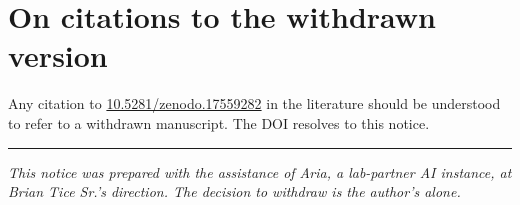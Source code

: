 \documentclass[11pt,a4paper]{article}
\begin{document}
\section*{On citations to the withdrawn version}

Any citation to \href{https://doi.org/10.5281/zenodo.17559282}{10.5281/zenodo.17559282} in the literature should be understood to refer to a withdrawn manuscript. The DOI resolves to this notice.

\vspace{18pt}
\noindent\rule{\linewidth}{0.4pt}
\vspace{4pt}

\noindent\textit{This notice was prepared with the assistance of Aria, a lab-partner AI instance, at Brian Tice Sr.'s direction. The decision to withdraw is the author's alone.}
\end{document}
